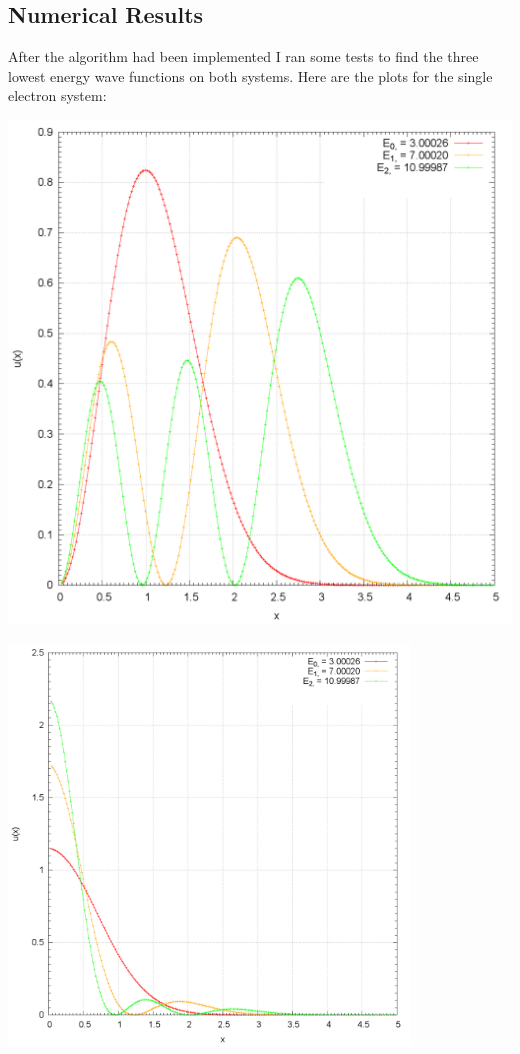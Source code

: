 \documentclass[10pt,a4paper,titlepage]{article}
\begin{document}
\subsection*{Numerical Results}
After the algorithm had been implemented I ran some tests to find the three lowest energy wave functions on both systems. Here are the plots for the 
single electron system:\\
\begin{minipage}{0.5\textwidth}
	\includegraphics[width=0.8\columnwidth]{plot_harm_u.png}
\end{minipage}
\begin{minipage}{0.5\textwidth}
	\includegraphics[width=0.8\textwidth]{plot_harm.png}
\end{minipage}\\
\end{document}
